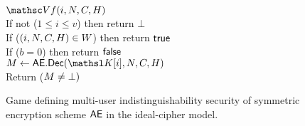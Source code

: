 \begin{figure} [t]
{
\underline{$\VfO(i,\iv,\ciph,\header)$}\\[2pt]
If not ($1\leq i\leq v$) then return $\bot$ \\
If ($(i,N,C,H) \in W$) then return $\mathsf{true}$ \\ 
If ($b=0$) then return $\mathsf{false}$ \\
$\msg \gets \seDec(\nkey[i],\iv,\ciph,\header)$ \\
Return ($M\neq\bot)$ \medskip


}
\vspace{-2ex}
\caption{Game defining multi-user indistinguishability security of symmetric encryption scheme $\mathsf{AE}$ in the ideal-cipher model.}
\label{fig-ind}
\hrulefill
\end{figure}



